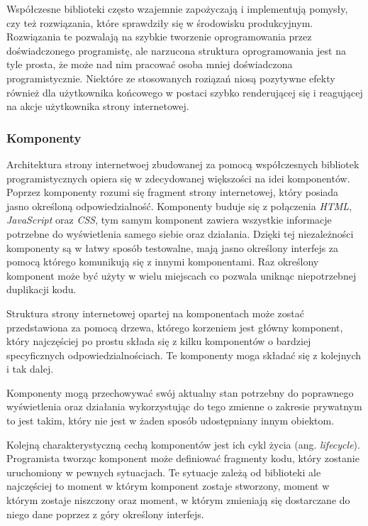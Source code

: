 \documentclass[polish, twoside, 12pt]{mwart}
\begin{document}
Współczesne biblioteki często wzajemnie zapożyczają i implementują pomysły, czy też rozwiązania, które sprawdziły się w środowisku produkcyjnym. Rozwiązania te pozwalają na szybkie tworzenie oprogramowania przez doświadczonego programistę, ale narzucona struktura oprogramowania jest na tyle prosta, że może nad nim pracować osoba mniej doświadczona programistycznie. Niektóre ze stosowanych roziązań niosą pozytywne efekty również dla użytkownika końcowego w postaci szybko renderującej się i reagującej na akcje użytkownika strony internetowej.

\subsubsection{Komponenty}

Architektura strony internetwoej zbudowanej za pomocą współczesnych bibliotek programistycznych opiera się w zdecydowanej większości na idei komponentów. Poprzez komponenty rozumi się fragment strony internetowej, który posiada jasno określoną odpowiedzialność. Komponenty buduje się z połączenia \emph{HTML}, \emph{JavaScript} oraz \emph{CSS}, tym samym komponent zawiera wszystkie informacje potrzebne do wyświetlenia samego siebie oraz działania. Dzięki tej niezależności komponenty są w łatwy sposób testowalne, mają jasno określony interfejs za pomocą którego komunikują się z innymi komponentami. Raz określony komponent może być użyty w wielu miejscach co pozwala uniknąc niepotrzebnej duplikacji kodu.

Struktura strony internetowej opartej na komponentach może zostać przedstawiona za pomocą drzewa, którego korzeniem jest główny komponent, który najczęściej po prostu składa się z kilku komponentów o bardziej specyficznych odpowiedzialnościach. Te komponenty moga składać się z kolejnych i tak dalej. 

Komponenty mogą przechowywać swój aktualny stan potrzebny do poprawnego wyświetlenia oraz działania wykorzystując do tego zmienne o zakresie prywatnym to jest takim, który nie jest w żaden sposób udostępniany innym obiektom.

Kolejną charakterystyczną cechą komponentów jest ich cykl życia (ang. \emph{lifecycle}). Programista tworząc komponent może definiować fragmenty kodu, który zostanie uruchomiony w pewnych sytuacjach. Te sytuacje zależą od biblioteki ale najczęściej to moment w którym komponent zostaje stworzony, moment w którym zostaje niszczony oraz moment, w którym zmieniają się dostarczane do niego dane poprzez z góry określony interfejs.
\end{document}
